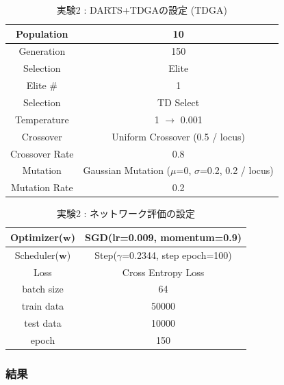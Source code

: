 \begin{table}[t]
  \begin{center}
    \caption{実験2 : DARTS+TDGAの設定 (TDGA)}
  	\vspace{3mm}
    \begin{tabular}{|c|c|} \hline
      Population & 10 \\ \hline
      Generation & 150 \\ \hline \hline
      Selection & Elite \\ \hline
      Elite \# & 1 \\ \hline
      Selection & TD Select \\ \hline
      Temperature & 1 $\rightarrow$ 0.001 \\ \hline \hline
      Crossover & Uniform Crossover (0.5 / locus) \\ \hline
      Crossover Rate & 0.8 \\ \hline \hline
      Mutation & Gaussian Mutation ($\mu$=0, $\sigma$=0.2, 0.2 / locus)\\ \hline
      Mutation Rate & 0.2 \\ \hline
    \end{tabular}
    \label{tab:setting_ga}
  \end{center}
\end{table}

\begin{table}[t]
  \begin{center}
    \caption{実験2 : ネットワーク評価の設定}
  	\vspace{3mm}
    \begin{tabular}{|c|c|} \hline
      Optimizer($\bm{w}$) & SGD(lr=0.009, momentum=0.9) \\ \hline
      Scheduler($\bm{w}$) & Step($\gamma$=0.2344, step epoch=100) \\ \hline
      Loss & Cross Entropy Loss \\ \hline
      batch size & 64 \\ \hline
      train data & 50000\\ \hline
      test data &  10000\\ \hline
      epoch & 150\\ \hline
    \end{tabular}
    \label{tab:setting_eval}
  \end{center}
\end{table}


\clearpage
\changeindent{0cm}
\subsubsection{結果}
\label{sec:exp.02_02}
\changeindent{2cm}



